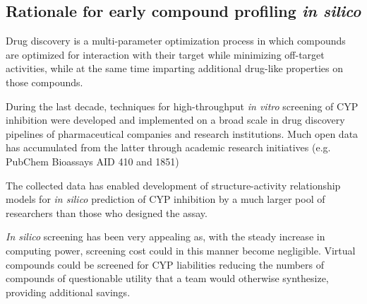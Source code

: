 \subsection{Rationale for early compound profiling \textit{in silico}}

Drug discovery is a multi-parameter optimization process in which compounds are optimized for interaction with their target while minimizing off-target activities, while at the same time imparting additional drug-like properties on those compounds.\cite{Zlokarnik2005}



During the last decade, techniques for high-throughput \textit{in vitro} screening of CYP inhibition were developed and implemented on a broad scale in drug discovery pipelines of pharmaceutical companies and research institutions. Much open data has accumulated from the latter through academic research initiatives (e.g. PubChem Bioassays AID 410 and 1851)

The collected data has enabled development of structure-activity relationship models for \textit{in silico} prediction of CYP inhibition by a much larger pool of researchers than those who designed the assay.


\textit{In silico} screening has been very appealing as, with the steady increase in computing power, screening cost could in this manner become negligible. Virtual compounds could be screened for CYP liabilities reducing the numbers of compounds of questionable utility that a team would otherwise synthesize, providing additional savings.\cite{Zlokarnik2005}


